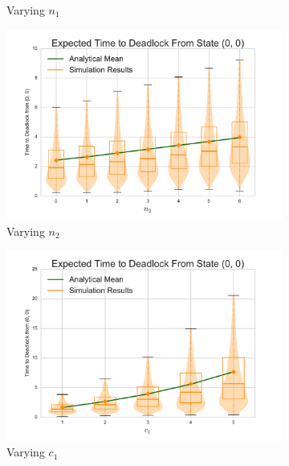 \documentclass{article}
\numberwithin{equation}{section}
\begin{document}
\begin{figure}[!htbp]
\begin{center}
\begin{subfigure}[b]{0.34\textwidth}
    \caption{Varying $n_1$}
    \label{fig:2Nms_n1}
  \end{subfigure}
  \begin{subfigure}[b]{0.34\textwidth}
    \includegraphics[width=\textwidth]{images/varyn2_2Nms}
    \caption{Varying $n_2$}
    \label{fig:2Nms_n2}
  \end{subfigure}
  \begin{subfigure}[b]{0.34\textwidth}
    \includegraphics[width=\textwidth]{images/varyc1_2Nms}
    \caption{Varying $c_1$}
    \label{fig:2Nms_c1}
  \end{subfigure}
  \begin{subfigure}[b]{0.34\textwidth}

\end{subfigure}
\end{center}
\end{figure}
\end{document}
